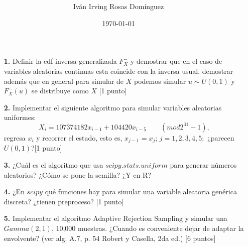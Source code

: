 \documentclass[letterpaper]{article}
\title{\textbf{}}
\author{Iván Irving Rosas Domínguez}
\date{\today}
\newcommand{\1}{\mathds{1}}
\theoremstyle{definition}
\theoremstyle{definition}
\theoremstyle{definition}
\theoremstyle{definition}
\theoremstyle{definition}
\begin{document}
\maketitle


\begin{enumerate}
    \item[\textbf{1.}] Definir la cdf inversa generalizada $F_X^{-}$ y demostrar que en 
    el caso de variables aleatorias continuas esta coincide con la inversa usual. demostrar
    además que en general para simular de $X$ podemos simular $u\sim U(0,1)$ y $F_X^{-}(u)$ se 
    distribuye como $X$ [1 punto]
    \item[\textbf{2.}]Implementar el siguiente algoritmo para simular variables aleatorias 
    uniformes:
    \[
    X_i=107374182x_{i-1}+104420x_{i-5} \qquad (mod 2^{31}-1),
    \]
    regresa $x_i$ y recorrer el estado, esto es, $x_{j-1}=x_{j}$; $j=1,2,3,4,5;$ ¿parecen $U(0,1)$?[1 punto]
    \item[\textbf{3.}] ¿Cuál es el algoritmo que usa $scipy.stats.uniform$ para generar números aleatorios?
    ¿Cómo se pone la semilla? ¿Y en R?
    \item[\textbf{4.}] ¿En $scipy$ qué funciones hay para simular una variable aleatoria
    genérica discreta? ¿tienen preproceso? [1 punto]
    \item[\textbf{5.}] Implementar el algoritmo Adaptive Rejection Sampling y simular una $Gamma(2,1)$, 10,000 muestras. ¿Cuando
    es conveniente dejar de adaptar la envolvente? (ver alg. A.7, p. 54 Robert y Casella, 2da ed.) [6 puntos]
\end{enumerate}
\end{document}
